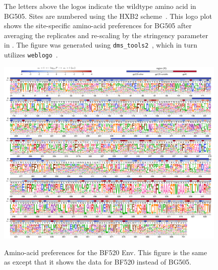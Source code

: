 \documentclass[9pt]{elife}
\begin{document}
\begin{figure}
\begin{fullwidth}
{The letters above the logos indicate the wildtype amino acid in BG505.
Sites are numbered using the HXB2 scheme~\citep{korber1998numbering}.
This logo plot shows the site-specific amino-acid preferences for BG505 after averaging the replicates and re-scaling by the stringency parameter in .
The figure was generated using \texttt{dms\_tools2}~\citep[\url{https://jbloomlab.github.io/dms_tools2/}]{bloom2015software}, which in turn utilizes \texttt{weblogo}~\citep{crooks2004weblogo}.
}
\end{fullwidth}
\end{figure}

\begin{figure}
\begin{fullwidth}
{\includegraphics[width=1.3\textwidth]{figures/BF520_prefs.pdf}}
\caption{\label{fig:BF520prefs}
Amino-acid preferences for the BF520 Env.
This figure is the same as  except that it shows the data for BF520 instead of BG505.
}
\end{fullwidth}
\end{figure}
\end{document}
